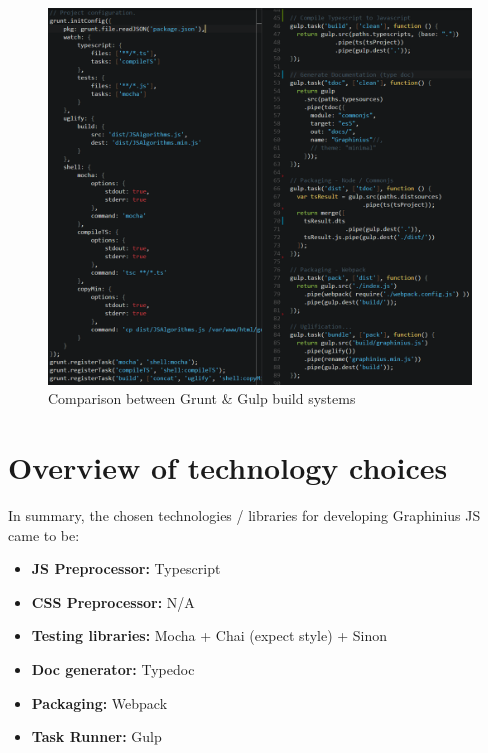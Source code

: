 	\begin{figure}[ht]
		\label{fig_grunt_gulp}
		\centering
		\hspace*{-1.4cm}
		\includegraphics[width=1.2\textwidth]{figures/grunt_gulp_comparison}
		\caption{Comparison between Grunt \& Gulp build systems}
	\end{figure}
	

\section{Overview of technology choices}
\label{sect:design_choices}

In summary, the chosen technologies / libraries for developing Graphinius JS came to be:

\begin{itemize}
	\item \textbf{JS Preprocessor:} Typescript
	\item \textbf{CSS Preprocessor:} N/A
	\item \textbf{Testing libraries:} Mocha + Chai (expect style) + Sinon
	\item \textbf{Doc generator:} Typedoc
	\item \textbf{Packaging:} Webpack
	\item \textbf{Task Runner:} Gulp
\end{itemize}
